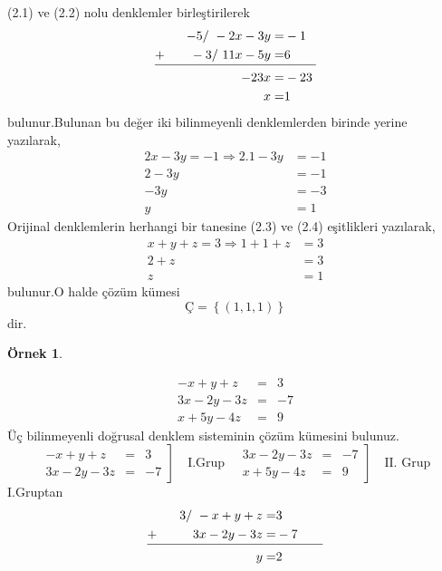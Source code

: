 \documentclass[a4paper,10pt]{book}
\theoremstyle{italik}
\newtheorem{ornek}{Örnek}[chapter]
\begin{document}
(2.1) ve (2.2) nolu denklemler birleştirilerek
\begin{alignat}{4}
	-5/ \  -2x-3y= & -1 \nonumber \\
	\underline{+ \hspace{7mm} \strut -3/ \ 11x-5y= } & \underline{\strut 6 \qquad }\nonumber \\
	-23x= & -23 \nonumber \\
	x= & 1 
\end{alignat}
bulunur.Bulunan bu değer iki bilinmeyenli denklemlerden birinde yerine yazılarak,
\begin{align}
	2x-3y=-1 \Rightarrow 2.1-3y & =-1 \nonumber \\
	2-3y & =-1 \nonumber \\
	-3y & = -3  \nonumber \\
	y & = 1
\end{align}
Orijinal denklemlerin herhangi bir tanesine (2.3) ve (2.4) eşitlikleri yazılarak,
\begin{align}
	x+y+z=3 \Rightarrow 1+1+z & = 3 \nonumber \\
	2+z & =3 \nonumber \\
	z & =1  \nonumber  
\end{align}
bulunur.O halde çözüm kümesi
$$
\text{\c{C}}=\left\{(1,1,1)\right\}
$$ 
dir.
\begin{ornek}
\end{ornek}
\begin{eqnarray*}
	-x+y+z & = & 3 \\
	3x-2y-3z & = & -7 \\
	x+5y-4z & = & 9
\end{eqnarray*}
Üç bilinmeyenli doğrusal denklem sisteminin çözüm kümesini bulunuz.
\begin{equation*}
	\left.
	\begin{aligned}
		-x+y+z & = & 3 \\
		3x-2y-3z & = & -7
	\end{aligned}
	\right] \quad \text{I.Grup} \quad
	\left.
	\begin{aligned}
		3x-2y-3z & = & -7 \\
		x+5y-4z & = & 9
	\end{aligned}
	\right] \quad \text{II. Grup}
\end{equation*}
I.Gruptan
\begin{alignat}{4}
	3/ \  -x+y+z= & 3 \nonumber \\
	\underline{+ \hspace{10mm} \strut 3x-2y-3z= } & \underline{\strut -7 \qquad}\nonumber \\
	y= & 2
\end{alignat}
\end{document}
